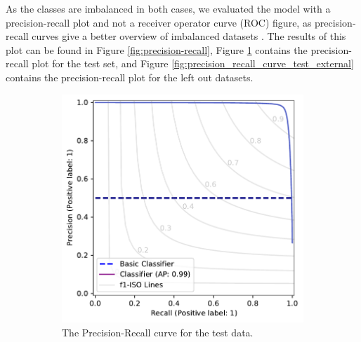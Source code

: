 \documentclass[a4paper, 12pt, oneside]{book} %
\begin{document}
As the classes are imbalanced in both cases, we evaluated the model with a precision-recall plot and not a receiver operator curve (ROC) figure, as precision-recall curves give a better overview of imbalanced datasets \autocite{saito_precision-recall_2015}.
The results of this plot can be found in Figure \ref{fig:precision-recall}, Figure \ref{fig:precision_recall_curve_test} contains the precision-recall plot for the test set, and Figure \ref{fig:precision_recall_curve_test_external} contains the precision-recall plot for the left out datasets.
\begin{figure} [htpb]
     \centering
     \begin{subfigure}[b]{0.48\textwidth}
         \centering
         \includegraphics[width=\textwidth]{precision_recall_plot.pdf}
         \caption{The Precision-Recall curve for the test data.}
         \label{fig:precision_recall_curve_test}
     \end{subfigure}
     \hfill
     \begin{subfigure}[b]{0.48\textwidth}
         \centering

\end{subfigure}
\end{figure}
\end{document}
